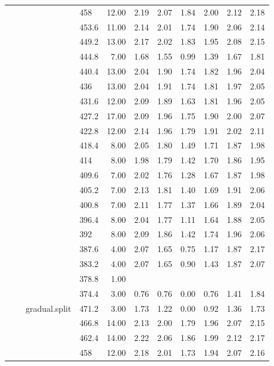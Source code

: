 \begin{longtable}{llllrrrrrrr}
   &  &  & 458 & 12.00 & 2.19 & 2.07 & 1.84 & 2.00 & 2.12 & 2.18 \\ 
   &  &  & 453.6 & 11.00 & 2.14 & 2.01 & 1.74 & 1.90 & 2.06 & 2.14 \\ 
   &  &  & 449.2 & 13.00 & 2.17 & 2.02 & 1.83 & 1.95 & 2.08 & 2.15 \\ 
   &  &  & 444.8 & 7.00 & 1.68 & 1.55 & 0.99 & 1.39 & 1.67 & 1.81 \\ 
   &  &  & 440.4 & 13.00 & 2.04 & 1.90 & 1.74 & 1.82 & 1.96 & 2.04 \\ 
   &  &  & 436 & 13.00 & 2.04 & 1.91 & 1.74 & 1.81 & 1.97 & 2.05 \\ 
   &  &  & 431.6 & 12.00 & 2.09 & 1.89 & 1.63 & 1.81 & 1.96 & 2.05 \\ 
   &  &  & 427.2 & 17.00 & 2.09 & 1.96 & 1.75 & 1.90 & 2.00 & 2.07 \\ 
   &  &  & 422.8 & 12.00 & 2.14 & 1.96 & 1.79 & 1.91 & 2.02 & 2.11 \\ 
   &  &  & 418.4 & 8.00 & 2.05 & 1.80 & 1.49 & 1.71 & 1.87 & 1.98 \\ 
   &  &  & 414 & 8.00 & 1.98 & 1.79 & 1.42 & 1.70 & 1.86 & 1.95 \\ 
   &  &  & 409.6 & 7.00 & 2.02 & 1.76 & 1.28 & 1.67 & 1.87 & 1.98 \\ 
   &  &  & 405.2 & 7.00 & 2.13 & 1.81 & 1.40 & 1.69 & 1.91 & 2.06 \\ 
   &  &  & 400.8 & 7.00 & 2.11 & 1.77 & 1.37 & 1.66 & 1.89 & 2.04 \\ 
   &  &  & 396.4 & 8.00 & 2.04 & 1.77 & 1.11 & 1.64 & 1.88 & 2.05 \\ 
   &  &  & 392 & 8.00 & 2.09 & 1.86 & 1.42 & 1.74 & 1.96 & 2.06 \\ 
   &  &  & 387.6 & 4.00 & 2.07 & 1.65 & 0.75 & 1.17 & 1.87 & 2.17 \\ 
   &  &  & 383.2 & 4.00 & 2.07 & 1.65 & 0.90 & 1.43 & 1.87 & 2.07 \\ 
   &  &  & 378.8 & 1.00 &  &  &  &  &  &  \\ 
   &  &  & 374.4 & 3.00 & 0.76 & 0.76 & 0.00 & 0.76 & 1.41 & 1.84 \\ 
   &  & gradual.split & 471.2 & 3.00 & 1.73 & 1.22 & 0.00 & 0.92 & 1.36 & 1.73 \\ 
   &  &  & 466.8 & 14.00 & 2.13 & 2.00 & 1.79 & 1.96 & 2.07 & 2.15 \\ 
   &  &  & 462.4 & 14.00 & 2.22 & 2.06 & 1.86 & 1.99 & 2.12 & 2.17 \\ 
   &  &  & 458 & 12.00 & 2.18 & 2.01 & 1.73 & 1.94 & 2.07 & 2.16 \\ 

\end{longtable}

